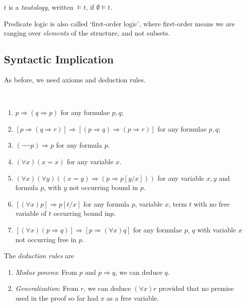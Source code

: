 \documentclass[a3paper, 10pt]{article}
\newcommand{\enumpre}{}
\renewcommand{\vocab}[1]{\emph{#1}}
\begin{document}
\begin{multicols*}{5}
\begin{definition}[Tautology]
  $t$ is a \vocab{tautology}, written $\models t$, if $\emptyset \models t$.
\end{definition}

Predicate logic is also called `first-order logic', where first-order means we are ranging over \emph{elements} of the structure, and not subsets.

\subsection{Syntactic Implication}

As before, we need axioms and deduction rules.

\begin{definition}~
  \enumpre
  \begin{enumerate}
    \item $p \Rightarrow (q \Rightarrow p)$ for any formulae $p, q $;
    \item $[p \Rightarrow (q \Rightarrow r)] \Rightarrow [(p \Rightarrow q) \Rightarrow (p \Rightarrow r)]$ for any formulae $p, q$;
    \item $(\lnot \lnot p) \Rightarrow p$ for any formula $p$.
    \item $(\forall x)(x = x)$ for any variable $x$.
    \item $(\forall x)(\forall y)((x = y) \Rightarrow (p \Rightarrow p[y/x]))$ for any variable $x, y$ and formula $p$, with $y$ not occurring bound in $p$.
    \item $[(\forall x)p] \Rightarrow p[t/x]$ for any formula $p$, variable $x$, term $t$ with no free variable of $t$ occurring bound in$p$.
    \item $[(\forall x)(p\Rightarrow q)] \Rightarrow [p\Rightarrow(\forall x)q]$ for any formulae $p$, $q$ with variable $x$ not occurring free in $p$.
  \end{enumerate}
\end{definition}

\begin{definition}
  The \vocab{deduction rules} are 
  \begin{enumerate}
    \item \emph{Modus ponens}: From $p$ and $p \Rightarrow q$, we can deduce $q$.
    \item \emph{Generalization}: From $r$, we can deduce $(\forall x)r$ provided that no premise used in the proof so far had $x$ as a free variable.
  \end{enumerate}
\end{definition}


\end{multicols*}
\end{document}

